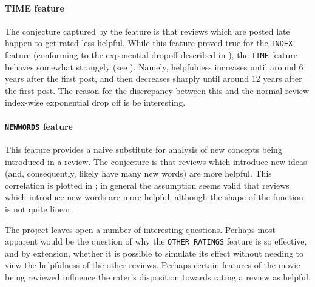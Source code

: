 \documentclass[letter,10pt]{article}
\begin{document}

\paragraph{TIME feature}
The conjecture captured by the feature is that reviews which are posted
	late happen to get rated less helpful.
While this feature proved true for the {\tt INDEX} feature
	(conforming to the exponential dropoff described in
	), the {\tt TIME} feature behaves
	somewhat strangely (see ).
Namely, helpfulness increases until around 6 years after the first post,
	and then decreases sharply until around 12 years after the first post.
The reason for the discrepancy between this and the normal
	review index-wise exponential drop off is be interesting.


\paragraph{{\tt NEWWORDS} feature}
This feature provides a naive substitute for analysis of new concepts being
	introduced in a review. 
The conjecture is that reviews which introduce new ideas (and, consequently,
	likely have many new words) are more helpful.
This correlation is plotted in ;
	in general the assumption seems valid that reviews which introduce
	new words are more helpful, although the shape of the function
	is not quite linear.



The project leaves open a number of interesting questions.
Perhaps most apparent would be the question of why the {\tt OTHER\_RATINGS}
	feature is so effective, and by extension, whether it is possible
	to simulate its effect without needing to view the helpfulness
	of the other reviews.
Perhaps certain features of the movie being reviewed influence the
	rater's disposition towards rating a review as helpful.
\end{document}
